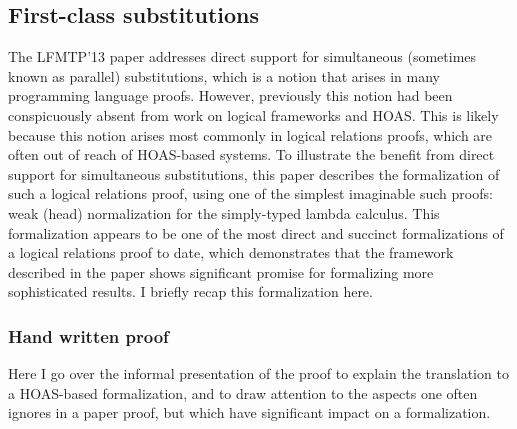 \documentclass{article}
\begin{document}
\subsection{First-class substitutions}\label{sec:lfmtp13}
The LFMTP'13 paper \citep{Cave13} addresses direct support for
simultaneous (sometimes known as parallel)
substitutions, which is a notion that arises in many programming
language proofs. However, previously this notion had been
conspicuously absent from work on logical frameworks and HOAS. This is
likely because this notion arises most commonly in logical relations
proofs, which are often out of reach of HOAS-based systems. To
illustrate the benefit from direct support for
simultaneous substitutions, this paper describes the formalization of such
a logical relations proof, using one of the simplest
imaginable such proofs: weak (head) normalization for the
simply-typed lambda calculus. This formalization appears to be one of
the most direct and succinct formalizations of a logical relations
proof to date, which demonstrates that the framework described in the
paper shows significant promise for formalizing more sophisticated results. I briefly recap
this formalization here. 




\subsubsection{Hand written proof}

Here I go over the informal presentation of the proof to explain
the translation to a HOAS-based formalization, and to draw attention
to the aspects one often ignores in a paper proof, but which have
significant impact on a formalization.
\end{document}
